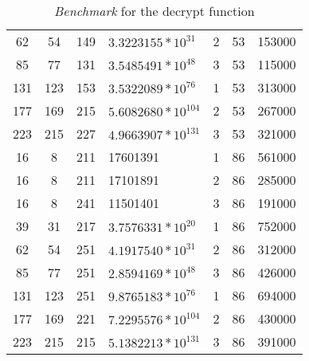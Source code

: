 \documentclass[a4paper,11pt]{article}
\begin{document}
\begin{table}[h]
\begin{tabular}{ |c|c|c|p{3cm}|c|c|c| }
      62 & 54 & 149 & \begin{math} 3.3223155 \ast 10^{31} \end{math} & 2 & 53 & 153000 \\
      85 & 77 & 131 & \begin{math} 3.5485491 \ast 10^{48} \end{math} & 3 & 53 & 115000 \\
      131 & 123 & 153  & \begin{math} 3.5322089 \ast 10^{76} \end{math} & 1 & 53 & 313000 \\
      177 & 169 & 215  & \begin{math} 5.6082680 \ast 10^{104} \end{math} & 2 & 53 & 267000 \\
      223 & 215 & 227  & \begin{math} 4.9663907 \ast 10^{131} \end{math} & 3 & 53 & 321000 \\
      16 & 8 & 211 & 17601391 & 1 & 86 & 561000 \\
      16 & 8 & 211 & 17101891 & 2 & 86 & 285000 \\
      16 & 8 & 241 & 11501401 & 3 & 86 & 191000 \\
      39 & 31 & 217 & \begin{math} 3.7576331 \ast 10^{20} \end{math} & 1 & 86 & 752000 \\
      62 & 54 & 251 & \begin{math} 4.1917540 \ast 10^{31} \end{math} & 2 & 86 & 312000 \\
      85 & 77 & 251 & \begin{math} 2.8594169 \ast 10^{48} \end{math} & 3 & 86 & 426000 \\
      131 & 123 & 251  & \begin{math} 9.8765183 \ast 10^{76} \end{math} & 1 & 86 & 694000 \\
      177 & 169 & 221  & \begin{math} 7.2295576 \ast 10^{104} \end{math} & 2 & 86 & 430000 \\
      223 & 215 & 215  & \begin{math} 5.1382213 \ast 10^{131} \end{math} & 3 & 86 & 391000 \\

      \hline
    \end{tabular}
    \caption{\emph{Benchmark} for the decrypt function}
    \label{tab:res:Decrypt}
\end{table}
\end{document}
